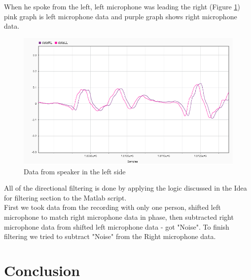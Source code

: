 When he spoke from the left, left microphone was leading the right (Figure \ref{fig:L}) pink graph is left microphone data and purple graph shows right microphone data.\\

 
\begin{figure}[htp]
  \centering
  \includegraphics[width=0.75\linewidth]{Illustrations/DataL.png}
  \caption{Data from speaker in the left side}
  \label{fig:L}
\end{figure}

 

All of the directional filtering is done by applying the logic discussed in the Idea for filtering section to 
the Matlab script.\\
First we took data from the recording with only one person, shifted left microphone to match right microphone 
data in phase, then subtracted right microphone data from shifted left microphone data - got "Noise". To finish filtering we tried to subtract "Noise" from the Right microphone data.\\


\section{Conclusion}